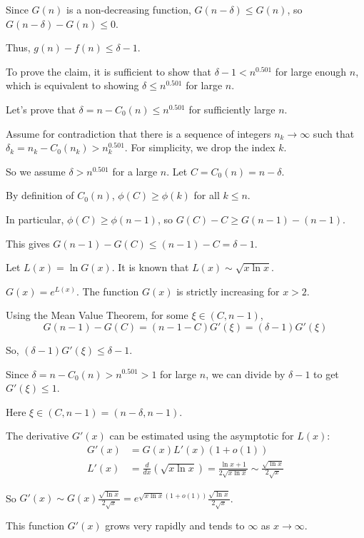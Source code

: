 \documentclass[12pt,a4paper]{article}
\theoremstyle{definition}
\begin{document}
        Since $G(n)$ is a non-decreasing function, $G(n-\delta) \leq G(n)$, so $G(n-\delta)-G(n) \leq 0$.

        Thus, $g(n)-f(n) \leq \delta-1$.

        To prove the claim, it is sufficient to show that $\delta-1 < n^{0.501}$ for large enough $n$, which is equivalent to showing $\delta \leq n^{0.501}$ for large $n$.

        Let's prove that $\delta = n-C_0(n) \leq n^{0.501}$ for sufficiently large $n$.

        Assume for contradiction that there is a sequence of integers $n_k \to \infty$ such that $\delta_k = n_k-C_0(n_k) > n_k^{0.501}$. For simplicity, we drop the index $k$.

        So we assume $\delta > n^{0.501}$ for a large $n$. Let $C=C_0(n)=n-\delta$.

        By definition of $C_0(n)$, $\phi(C) \geq \phi(k)$ for all $k \leq n$.

        In particular, $\phi(C) \geq \phi(n-1)$, so $G(C)-C \geq G(n-1)-(n-1)$.

        This gives $G(n-1)-G(C) \leq (n-1)-C = \delta-1$.

        Let $L(x) = \ln G(x)$. It is known that $L(x) \sim \sqrt{x \ln x}$.

        $G(x) = e^{L(x)}$. The function $G(x)$ is strictly increasing for $x>2$.

        Using the Mean Value Theorem, for some $\xi \in (C, n-1)$,
        $$G(n-1)-G(C) = (n-1-C)G'(\xi) = (\delta-1)G'(\xi)$$

        So, $(\delta-1)G'(\xi) \leq \delta-1$.

        Since $\delta=n-C_0(n)>n^{0.501}>1$ for large $n$, we can divide by $\delta-1$ to get $G'(\xi) \leq 1$.

        Here $\xi \in (C, n-1) = (n-\delta, n-1)$.

        The derivative $G'(x)$ can be estimated using the asymptotic for $L(x)$:
        \begin{align}
            G'(x) &= G(x)L'(x)(1+o(1))\\
            L'(x) &= \frac{d}{dx}(\sqrt{x\ln x}) = \frac{\ln x+1}{2\sqrt{x\ln x}} \sim \frac{\sqrt{\ln x}}{2\sqrt{x}}
        \end{align}

        So $G'(x) \sim G(x) \frac{\sqrt{\ln x}}{2\sqrt{x}} = e^{\sqrt{x\ln x}(1+o(1))} \frac{\sqrt{\ln x}}{2\sqrt{x}}$.

        This function $G'(x)$ grows very rapidly and tends to $\infty$ as $x\to\infty$.
\end{document}
